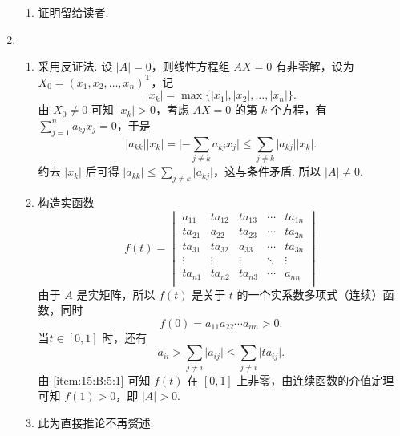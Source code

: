 \begin{enumerate}
\begin{enumerate}
              \item 证明留给读者.
          \end{enumerate}

    \item \begin{enumerate}
              \item \label{item:15:B:5:1}
                    采用反证法. 设 $\lvert A \rvert = 0$，则线性方程组 $AX = 0$ 有非零解，设为 $X_0 = (x_1, x_2, \ldots, x_n)^{\mathrm{T}}$，记
                    \[\lvert x_k \rvert = \max \{\lvert x_1 \rvert, \lvert x_2 \rvert, \ldots, \lvert x_n \rvert\}.\]
                    由 $X_0 \neq 0$ 可知 $\lvert x_k \rvert > 0$，考虑 $AX = 0$ 的第 $k$ 个方程，有 $\displaystyle\sum_{j=1}^n a_{kj}x_j = 0$，于是
                    \[\lvert a_{kk} \rvert \lvert x_k \rvert = \lvert -\displaystyle\sum_{j \neq k}a_{kj}x_j \rvert \leqslant \sum_{j \neq k}\lvert a_{kj} \rvert \lvert x_k \rvert.\]
                    约去 $\lvert x_k \rvert$ 后可得 $\lvert a_{kk} \rvert \leqslant \displaystyle\sum_{j \neq k} \lvert a_{kj} \rvert$，这与条件矛盾. 所以 $\lvert A \rvert \neq 0$.

              \item 构造实函数
                    \[f(t) = \begin{vmatrix}
                            a_{11}  & ta_{12} & ta_{13} & \cdots & ta_{1n} \\
                            ta_{21} & a_{22}  & ta_{23} & \cdots & ta_{2n} \\
                            ta_{31} & ta_{32} & a_{33}  & \cdots & ta_{3n} \\
                            \vdots  & \vdots  & \vdots  & \ddots & \vdots  \\
                            ta_{n1} & ta_{n2} & ta_{n3} & \cdots & a_{nn}  \\
                        \end{vmatrix}\]
                    由于 $A$ 是实矩阵，所以 $f(t)$ 是关于 $t$ 的一个实系数多项式（连续）函数，同时
                    \[f(0) = a_{11}a_{22}\cdots a_{nn} > 0.\] 当$t \in [0, 1]$ 时，还有
                    \[a_{ii} > \sum_{j \neq i} \lvert a_{ij} \rvert \leqslant \sum_{j \neq i} \lvert ta_{ij} \rvert.\]
                    由 \ref*{item:15:B:5:1} 可知 $f(t)$ 在 $[0, 1]$ 上非零，由连续函数的介值定理可知 $f(1) > 0$，即 $\lvert A \rvert > 0$.

              \item 此为直接推论不再赘述.
          \end{enumerate}
\end{enumerate}

\clearpage
